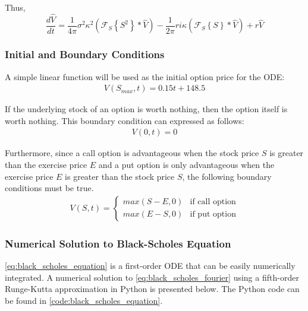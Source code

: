 \noindent
Thus,
\begin{equation}
    \label{eq:black_scholes_fourier}
    \frac{d \hat{V}}{dt} = \frac{1}{4 \pi}\sigma^2 \kappa^2 ( \mathcal{F}_S \left\{ S^2 \right\} * \hat{V} ) - \frac{1}{2 \pi} r i \kappa ( \mathcal{F}_S \left\{ S \right\} * \hat{V} ) + r \hat{V}
\end{equation}

\subsubsection{Initial and Boundary Conditions}
A simple linear function will be used as the initial option price for the ODE:
\begin{align}
    V(S_{max}, t)=0.15t + 148.5 \label{eq:black_scholes_equation_initial_condition}
\end{align}

\noindent
If the underlying stock of an option is worth nothing, then the option itself is worth nothing. This boundary condition can expressed as follows:
\begin{align}
    V(0, t) = 0
\end{align}

\noindent
Furthermore, since a call option is advantageous when the stock price \(S\) is greater than the exercise price \(E\) and a put option is only advantageous when the exercise price \(E\) is greater than the stock price \(S\), the following boundary conditions must be true.
\begin{align}
    V(S, t) = 
    \begin{cases}
        max(S-E, 0) & \text{if call option} \\
        max(E-S, 0) & \text{if put option}
    \end{cases}
\end{align}

\subsubsection{Numerical Solution to Black-Scholes Equation}
\cref{eq:black_scholes_equation} is a first-order ODE that can be easily numerically integrated. A numerical solution to \cref{eq:black_scholes_fourier} using a fifth-order Runge-Kutta approximation in Python is presented below. The Python code can be found in \cref{code:black_scholes_equation}.

